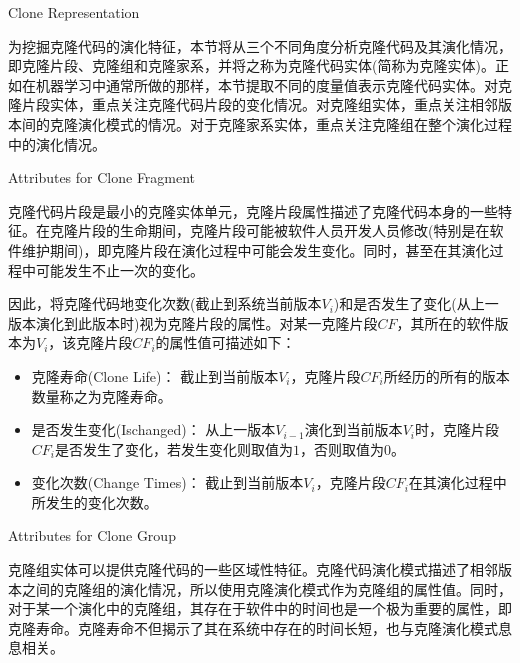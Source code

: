{Clone Representation}

为挖掘克隆代码的演化特征，本节将从三个不同角度分析克隆代码及其演化情况，即克隆片段、克隆组和克隆家系，并将之称为克隆代码实体(简称为克隆实体)。正如在机器学习中通常所做的那样，本节提取不同的度量值表示克隆代码实体。对克隆片段实体，重点关注克隆代码片段的变化情况。对克隆组实体，重点关注相邻版本间的克隆演化模式的情况。对于克隆家系实体，重点关注克隆组在整个演化过程中的演化情况。

{Attributes for Clone Fragment }

克隆代码片段是最小的克隆实体单元，克隆片段属性描述了克隆代码本身的一些特征。在克隆片段的生命期间，克隆片段可能被软件人员开发人员修改(特别是在软件维护期间)，即克隆片段在演化过程中可能会发生变化。同时，甚至在其演化过程中可能发生不止一次的变化。

因此，将克隆代码地变化次数(截止到系统当前版本$V_i$)和是否发生了变化(从上一版本演化到此版本时)视为克隆片段的属性。对某一克隆片段$CF$，其所在的软件版本为$V_i$，该克隆片段$CF_i$的属性值可描述如下：

\begin{itemize}
\item
克隆寿命(Clone Life)：
截止到当前版本$V_ i $，克隆片段$CF_i$所经历的所有的版本数量称之为克隆寿命。
\item
是否发生变化(Ischanged)：
从上一版本$V_{i-1} $演化到当前版本$V_ i $时，克隆片段$CF_i$是否发生了变化，若发生变化则取值为$1$，否则取值为$0$。
\item
变化次数(Change Times)：
截止到当前版本$V_ i $，克隆片段$CF_i$在其演化过程中所发生的变化次数。
\end{itemize}

{Attributes for Clone Group}

克隆组实体可以提供克隆代码的一些区域性特征。克隆代码演化模式描述了相邻版本之间的克隆组的演化情况，所以使用克隆演化模式作为克隆组的属性值。同时，对于某一个演化中的克隆组，其存在于软件中的时间也是一个极为重要的属性，即克隆寿命。克隆寿命不但揭示了其在系统中存在的时间长短，也与克隆演化模式息息相关。

